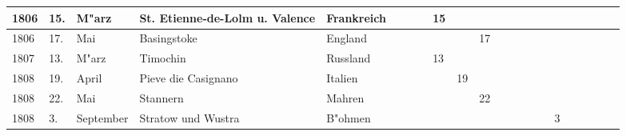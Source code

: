 \documentclass[a4paper, 8pt, oneside, polutonikogreek, german]{article}
\begin{document}
\begin{landscape}
\begin{table}[H]
\begin{longtable}{|p{5mm}|p{4mm}|p{13mm}|p{22mm}|p{15mm}|p{4mm}|p{6mm}|p{6mm}|p{6mm}|p{4mm}|p{5mm}|p{4mm}|p{5mm}|p{6mm}|p{5mm}|p{5mm}|p{5mm}|}
        1806 & 15. & M"arz & St. Etienne-de-Lolm u. Valence & Frankreich & ~ & ~ & 15 & ~ & ~ & ~ & ~ & ~ & ~ & ~ & ~ & ~ \\ \hline
        1806 & 17. & Mai & Basingstoke & England & ~ & ~ & ~ & ~ & 17 & ~ & ~ & ~ & ~ & ~ & ~ & ~ \\ \hline
        1807 & 13. & M"arz & Timochin & Russland & ~ & ~ & 13 & ~ & ~ & ~ & ~ & ~ & ~ & ~ & ~ & ~ \\ \hline
        1808 & 19. & April & Pieve die Casignano & Italien & ~ & ~ & ~ & 19 & ~ & ~ & ~ & ~ & ~ & ~ & ~ & ~ \\ \hline
        1808 & 22. & Mai & Stannern & Mahren & ~ & ~ & ~ & ~ & 22 & ~ & ~ & ~ & ~ & ~ & ~ & ~ \\ \hline
        1808 & 3. & September & Stratow und Wustra & B"ohmen & ~ & ~ & ~ & ~ & ~ & ~ & ~ & ~ & 3 & ~ & ~ & ~ \\ \hline
    \end{longtable}
\end{table}
\vspace*{\fill}
\end{landscape}
\clearpage
\end{document}
